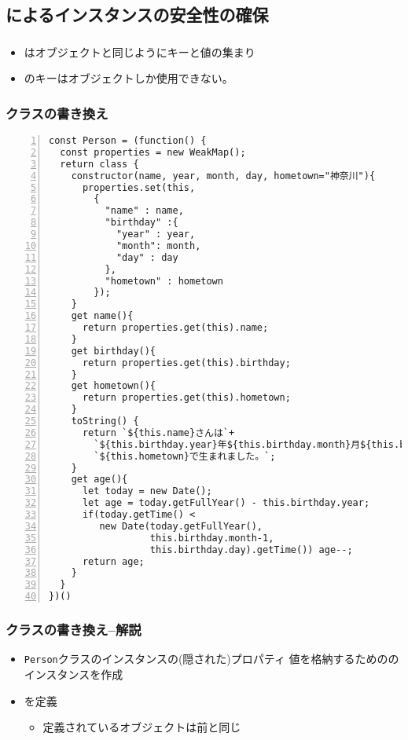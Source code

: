 \begin{frame}[containsverbatim]
\section{\protect{}によるインスタンスの安全性の確保}
\begin{frame}[containsverbatim]
 \frametitle{\protect{}}
 \begin{itemize}
  \item {}はオブジェクトと同じようにキーと値の集まり
  \item {}のキーはオブジェクトしか使用できない。
 \end{itemize}
\end{frame}
\begin{frame}[containsverbatim]
 \frametitle{\protect{}クラスの書き換え}
\begin{Verbatim}[numbers=left]
const Person = (function() {
  const properties = new WeakMap();
  return class {
    constructor(name, year, month, day, hometown="神奈川"){
      properties.set(this,
        {
          "name" : name,
          "birthday" :{
            "year" : year,
            "month": month,
            "day" : day
          },
          "hometown" : hometown
        });
    }
    get name(){
      return properties.get(this).name;
    }
    get birthday(){
      return properties.get(this).birthday;
    }
    get hometown(){
      return properties.get(this).hometown;
    }
    toString() {
      return `${this.name}さんは`+
        `${this.birthday.year}年${this.birthday.month}月${this.birthday.day}日に` +
        `${this.hometown}で生まれました。`;
    }
    get age(){
      let today = new Date();
      let age = today.getFullYear() - this.birthday.year;
      if(today.getTime() <
         new Date(today.getFullYear(),
                  this.birthday.month-1,
                  this.birthday.day).getTime()) age--;
      return age;
    }
  }
})()
\end{Verbatim}
\end{frame}
\begin{frame}[containsverbatim]
 \frametitle{\protect{}クラスの書き換え--解説}
 \begin{itemize}
  \item \texttt{Person}クラスのインスタンスの(隠された)プロパティ
        値を格納するためののインスタンスを作成
  \item {}を定義
        \begin{itemize}
         \item 定義されているオブジェクトは前と同じ

\end{itemize}
\end{itemize}
\end{frame}
\end{frame}
